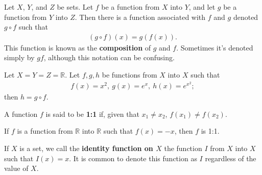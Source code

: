 \documentclass[12pt]{article}
\begin{document}
\begin{defn}
  Let $X$, $Y$, and $Z$ be sets. Let $f$ be a function from $X$ into $Y$, and let $g$
  be a function from $Y$ into $Z$. Then there is a function associated with $f$ and
  $g$ denoted $g \circ f$ such that
  \begin{align*}
    (g \circ f)(x) = g(f(x)).
  \end{align*}
  This function is known as the \textbf{composition} of $g$ and $f$. Sometimes it's
  denoted simply by $gf$, although this notation can be confusing.
\end{defn}

\begin{exm}
  Let $X = Y = Z = \mathbb{R}$. Let $f,g,h$ be functions from $X$ into $X$ such that
  \begin{align*}
    f(x) = x^2,\ g(x) = e^x,\ h(x) = e^{x^2};
  \end{align*}
  then $h = g \circ f$.
\end{exm}

\begin{defn}
  A function $f$ is said to be \textbf{1:1} if, given that $x_1 \neq x_2$, $f(x_1)
  \neq f(x_2)$.
\end{defn}

\begin{exm}
  If $f$ is a function from $\mathbb{R}$ into $\mathbb{R}$ such that $f(x) = -x$,
  then $f$ is 1:1.
\end{exm}

\begin{defn}
  If $X$ is a set, we call the \textbf{identity function on $X$} the function $I$
  from $X$ into $X$ such that $I(x) = x$. It is common to denote this function as $I$
  regardless of the value of $X$.
\end{defn}
\end{document}
